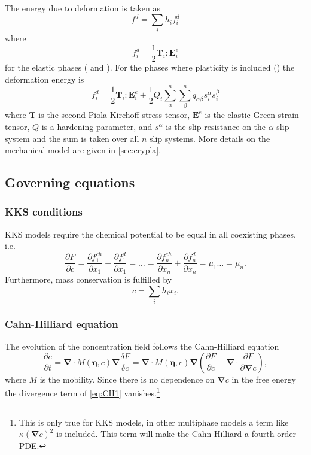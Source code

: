 \documentclass[12pt,a4paper]{article}
\newcommand{\vardiff}[2]{\frac{\delta#1}{\delta#2}}
\newcommand{\partdiff}[2]{\frac{\partial#1}{\partial#2}}
\providecommand{\vbf}[1]{\boldsymbol{#1}}
\providecommand{\gradient}[0]{\vbf{\nabla}}
\begin{document}
The energy due to deformation is taken as 
\begin{equation}
  f^d=\sum_i h_if^d_i
\end{equation}
where
\begin{equation}
  f^d_i = \frac{1}{2}\vbf{T}_i:\vbf{E}^e_i
\end{equation}
for the elastic phases ( and ).
For the phases where plasticity is included () the deformation energy is
\begin{equation}
  f^d_i = \frac{1}{2}\vbf{T}_i:\vbf{E}^e_i+\frac{1}{2}Q_i\sum_\alpha^n\sum_\beta^n q_{\alpha\beta}s^\alpha_i s^\beta_i
\end{equation}
where $\vbf{T}$ is the second Piola-Kirchoff stress tensor, $\vbf{E}^e$ is the elastic Green strain tensor, $Q$ is a hardening parameter, and $s^\alpha$ is the slip resistance on the $\alpha$ slip system and the sum is taken over all $n$ slip systems.
More details on the mechanical model are given in \cref{sec:crypla}.

\subsection{Governing equations}
\subsubsection{KKS conditions}
KKS models require the chemical potential to be equal in all coexisting phases, i.e.
\begin{equation}
  \partdiff{F}{c}=\partdiff{f_1^{ch}}{x_1}+\partdiff{f^d_1}{x_1}=\dots=\partdiff{f_n^{ch}}{x_n}+\partdiff{f^d_n}{x_n}=\mu_1\dots=\mu_n.
  \label{eq:KKS}
\end{equation}
Furthermore, mass conservation is fulfilled by
\begin{equation}
  c=\sum_ih_ix_i.
  \label{eq:mass}
\end{equation}
\subsubsection{Cahn-Hilliard equation}
The evolution of the concentration field follows the Cahn-Hilliard equation
\begin{equation}
  \partdiff{c}{t}=\gradient\cdot M(\vbf{\eta},c)\gradient \vardiff{F}{c}=\gradient\cdot M(\vbf{\eta},c)\gradient\left(\partdiff{F}{c}-\gradient\cdot\partdiff{F}{\gradient c}\right),
  \label{eq:CH1}
\end{equation}
where $M$ is the mobility.
Since there is no dependence on $\gradient c$ in the free energy the divergence term of \cref{eq:CH1} vanishes.\footnote{This is only true for KKS models, in other multiphase models a term like $\kappa\left(\gradient c\right)^2$ is included.
This term will make the Cahn-Hilliard a fourth order PDE.}
\end{document}
